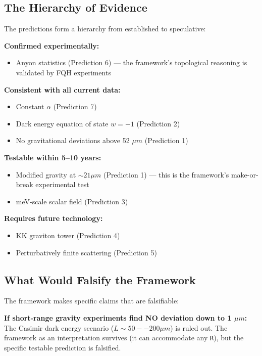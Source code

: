 \documentclass[aps,prd,preprint,superscriptaddress,longbibliography,floatfix]{revtex4-2}
\theoremstyle{remark}
\begin{document}
\subsection{The Hierarchy of Evidence}

The predictions form a hierarchy from established to speculative:

\textbf{Confirmed experimentally:}

\begin{itemize}
  \item Anyon statistics (Prediction 6) --- the framework's topological reasoning is validated by FQH experiments
\end{itemize}

\textbf{Consistent with all current data:}

\begin{itemize}
  \item Constant $\alpha$ (Prediction 7)
  \item Dark energy equation of state $w = -1$ (Prediction 2)
  \item No gravitational deviations above 52 $\mu m$ (Prediction 1)
\end{itemize}

\textbf{Testable within 5--10 years:}

\begin{itemize}
  \item Modified gravity at $\sim 21 \mu m$ (Prediction 1) --- this is the framework's make-or-break experimental test
  \item meV-scale scalar field (Prediction 3)
\end{itemize}

\textbf{Requires future technology:}

\begin{itemize}
  \item KK graviton tower (Prediction 4)
  \item Perturbatively finite scattering (Prediction 5)
\end{itemize}



\subsection{What Would Falsify the Framework}

The framework makes specific claims that are falsifiable:

\textbf{If short-range gravity experiments find NO deviation down to 1 $\mu m$:} The Casimir dark energy scenario ($L \sim  50--200 \mu m$) is ruled out. The framework as an interpretation survives (it can accommodate any \texttt{R}), but the specific testable prediction is falsified.
\end{document}
